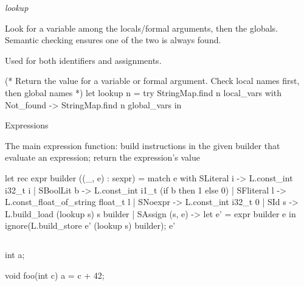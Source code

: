 \documentclass{plt}
\begin{document}
\begin{frame}[fragile=singleslide]{\emph{lookup}}

Look for a variable among the locals/formal arguments, then the
globals.  Semantic checking ensures one of the two is always found.

Used for both identifiers and assignments.

\begin{ocaml}
(* Return the value for a variable or formal argument.
   Check local names first, then global names *)
let lookup n = try StringMap.find n local_vars
               with Not_found -> StringMap.find n global_vars
in
\end{ocaml}

\end{frame}

\begin{frame}[fragile=singleslide]{Expressions}

The main expression function: build instructions in the given builder
that evaluate an expression; return the expression's value

\begin{ocaml}
let rec expr builder ((_, e) : sexpr) = match e with
    SLiteral i     -> L.const_int i32_t i
  | SBoolLit b     -> L.const_int i1_t (if b then 1 else 0)
  | SFliteral l    -> L.const_float_of_string float_t l
  | SNoexpr        -> L.const_int i32_t 0
  | SId s          -> L.build_load (lookup s) s builder
  | SAssign (s, e) -> let e' = expr builder e in
                      ignore(L.build_store e' (lookup s) builder); e'
\end{ocaml}

\begin{columns}
\begin{column}{0.4\textwidth}
\begin{C}
int a;

void foo(int c)
{
  a = c + 42;
}
\end{C}
\end{column}
\begin{column}{0.6\textwidth}
\end{column}
\end{columns}

\end{frame}
\end{document}

